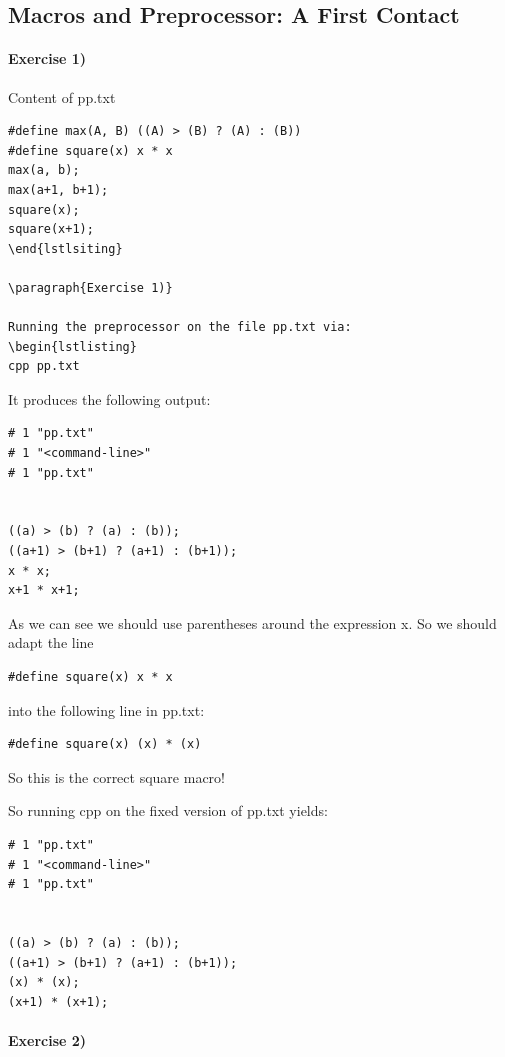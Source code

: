 \documentclass[12pt]{article}
\begin{document}
\subsection*{Macros and Preprocessor: A First Contact}
\paragraph{Exercise 1)}

Content of pp.txt
\begin{lstlisting}
#define max(A, B) ((A) > (B) ? (A) : (B))
#define square(x) x * x
max(a, b);
max(a+1, b+1);
square(x);
square(x+1);
\end{lstlsiting}

\paragraph{Exercise 1)}

Running the preprocessor on the file pp.txt via:
\begin{lstlisting}
cpp pp.txt
\end{lstlisting}

It produces the following output:
\begin{lstlisting}
# 1 "pp.txt"
# 1 "<command-line>"
# 1 "pp.txt"


((a) > (b) ? (a) : (b));
((a+1) > (b+1) ? (a+1) : (b+1));
x * x;
x+1 * x+1;
\end{lstlisting}

As we can see we should use parentheses around the expression x.
So we should adapt the line 
\begin{lstlisting}
#define square(x) x * x
\end{lstlisting}

into the following line in pp.txt:

\begin{lstlisting}
#define square(x) (x) * (x)
\end{lstlisting}
So this is the correct square macro!

So running cpp on the fixed version of pp.txt yields:
\begin{lstlisting}
# 1 "pp.txt"
# 1 "<command-line>"
# 1 "pp.txt"


((a) > (b) ? (a) : (b));
((a+1) > (b+1) ? (a+1) : (b+1));
(x) * (x);
(x+1) * (x+1);
\end{lstlisting}


\paragraph{Exercise 2)}
\end{document}
